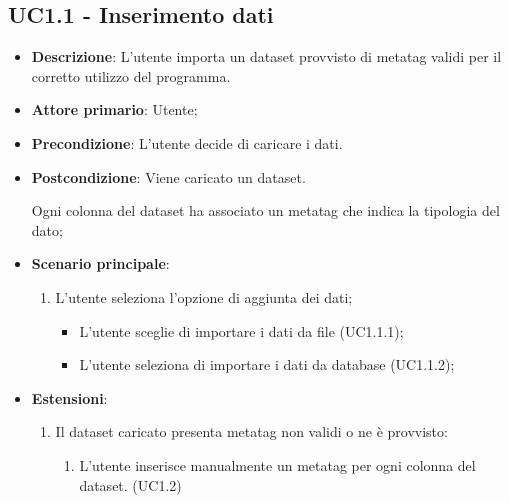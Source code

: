 \subsection{UC1.1 - Inserimento dati}
\begin{itemize}
    \item \textbf{Descrizione}: L'utente importa un dataset provvisto
                                di metatag validi per il corretto utilizzo del programma.

    \item \textbf{Attore primario}: Utente;
    
    \item \textbf{Precondizione}:   L'utente decide di caricare i dati.

    \item \textbf{Postcondizione}:  Viene caricato un dataset. 

                                    Ogni colonna del dataset ha associato
                                    un metatag che indica la tipologia del dato;

	\item \textbf{Scenario principale}:
		\begin{enumerate}
			\item L'utente seleziona l'opzione di aggiunta dei dati;
            \begin{itemize}
                \item L'utente sceglie di importare i dati da file (UC1.1.1);
                \item L'utente seleziona di importare i dati da database (UC1.1.2);
            \end{itemize}
            
        \end{enumerate}
    \item \textbf{Estensioni}:
        \begin{enumerate}
            \item Il dataset caricato presenta metatag non validi o ne è provvisto:
            \begin{enumerate}
                \item L'utente inserisce manualmente un metatag per ogni colonna del dataset. (UC1.2)
            \end{enumerate}    
        \end{enumerate}
\end{itemize}

